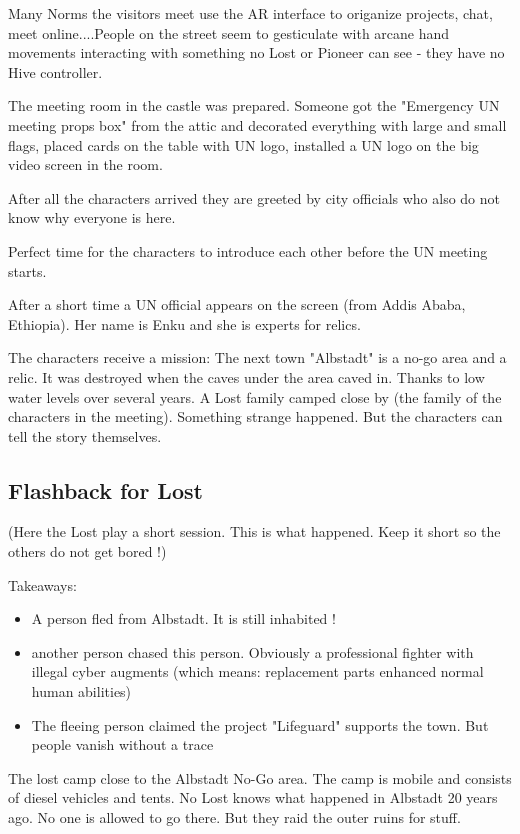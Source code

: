 Many Norms the visitors meet use the AR interface to origanize projects, chat, meet online....People on the street seem to gesticulate with arcane hand movements interacting with something no Lost or Pioneer can see - they have no Hive controller.

The meeting room in the castle was prepared. Someone got the "Emergency UN meeting props box" from the attic and decorated everything with large and small flags, placed cards on the table with UN logo, installed a UN logo on the big video screen in the room.

After all the characters arrived they are greeted by city officials who also do not know why everyone is here.

Perfect time for the characters to introduce each other before the UN meeting starts.

After a short time a UN official appears on the screen (from Addis Ababa, Ethiopia). Her name is Enku and she is experts for relics.

The characters receive a mission:
The next town "Albstadt" is a no-go area and a relic. It was destroyed when the caves under the area caved in. Thanks to low water levels over several years. A Lost family camped close by (the family of the characters in the meeting). Something strange happened. But the characters can tell the story themselves.

\subsection{Flashback for Lost}

(Here the Lost play a short session. This is what happened. Keep it short so the others do not get bored !)

Takeaways:

\begin{itemize}
    \item A person fled from Albstadt. It is still inhabited !
    \item another person chased this person. Obviously a professional fighter with illegal cyber augments (which means: replacement parts enhanced normal human abilities)
    \item The fleeing person claimed the project "Lifeguard" supports the town. But people vanish without a trace
\end{itemize}

The lost camp close to the Albstadt No-Go area. The camp is mobile and consists of diesel vehicles and tents. No Lost knows what happened in Albstadt 20 years ago. No one is allowed to go there. But they raid the outer ruins for stuff.

